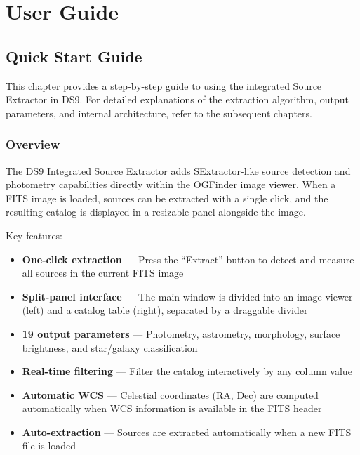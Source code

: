 \documentclass[11pt,fleqn]{book}
\begin{document}
\pagestyle{empty}
\tableofcontents
\pagestyle{fancy}

\part{User Guide}

\chapter{Quick Start Guide}
\label{ch:quickstart}

This chapter provides a step-by-step guide to using the integrated Source Extractor in DS9. For detailed explanations of the extraction algorithm, output parameters, and internal architecture, refer to the subsequent chapters.

\section{Overview}

The DS9 Integrated Source Extractor adds SExtractor-like source detection and photometry capabilities directly within the OGFinder image viewer. When a FITS image is loaded, sources can be extracted with a single click, and the resulting catalog is displayed in a resizable panel alongside the image.

Key features:
\begin{itemize}[leftmargin=2em]
  \item \textbf{One-click extraction} --- Press the ``Extract'' button to detect and measure all sources in the current FITS image
  \item \textbf{Split-panel interface} --- The main window is divided into an image viewer (left) and a catalog table (right), separated by a draggable divider
  \item \textbf{19 output parameters} --- Photometry, astrometry, morphology, surface brightness, and star/galaxy classification
  \item \textbf{Real-time filtering} --- Filter the catalog interactively by any column value
  \item \textbf{Automatic WCS} --- Celestial coordinates (RA, Dec) are computed automatically when WCS information is available in the FITS header
  \item \textbf{Auto-extraction} --- Sources are extracted automatically when a new FITS file is loaded
\end{itemize}
\end{document}
